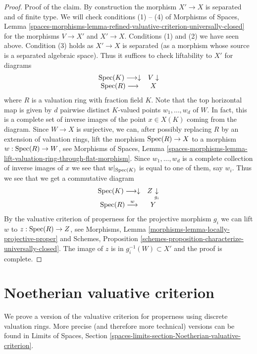 \begin{proof}
\medskip\noindent
Proof of the claim. By construction the morphism $X' \to X$ is separated
and of finite type. We will check conditions (1) -- (4) of
Morphisms of Spaces, Lemma
\ref{spaces-morphisms-lemma-refined-valuative-criterion-universally-closed}
for the morphisms $V \to X'$ and $X' \to X$.
Conditions (1) and (2) we have seen above.
Condition (3) holds as $X' \to X$ is separated (as a morphism whose
source is a separated algebraic space). Thus it suffices to check
liftability to $X'$ for diagrams
$$
\begin{array}{cc}\operatorname{Spec}(K) \longrightarrow\downarrow & V \downarrow \\ \operatorname{Spec}(R) \longrightarrow & X\end{array}
$$
where $R$ is a valuation ring with fraction field $K$.
Note that the top horizontal map is given by $d$ pairwise distinct
$K$-valued points $w_1, \ldots, w_d$ of $W$. In fact, this
is a complete set of inverse images of the point $x \in X(K)$
coming from the diagram. Since $W \to X$ is surjective,
we can, after possibly replacing $R$ by an extension of valuation rings,
lift the morphism $\operatorname{Spec}(R) \to X$ to a morphism $w : \operatorname{Spec}(R) \to W$, see
Morphisms of Spaces, Lemma
\ref{spaces-morphisms-lemma-lift-valuation-ring-through-flat-morphism}.
Since $w_1, \ldots, w_d$ is a complete collection of inverse images of
$x$ we see that $w|_{\operatorname{Spec}(K)}$ is equal to one of them, say $w_i$.
Thus we see that we get a commutative diagram
$$
\begin{array}{cc}\operatorname{Spec}(K) \longrightarrow\downarrow & Z \underset{g_i}{\downarrow} \\ \operatorname{Spec}(R) \overset{w}{\longrightarrow} & Y\end{array}
$$
By the valuative criterion of properness for the projective
morphism $g_i$ we can lift $w$ to $z : \operatorname{Spec}(R) \to Z$, see
Morphisms, Lemma \ref{morphisms-lemma-locally-projective-proper}
and
Schemes, Proposition \ref{schemes-proposition-characterize-universally-closed}.
The image of $z$ is in $g_i^{-1}(W) \subset X'$ and the proof is complete.
\end{proof}

\section{Noetherian valuative criterion}
\label{spaces-cohomology-section-Noetherian-valuative-criterion}
We prove a version of the valuative criterion for properness
using discrete valuation rings. More precise (and therefore more
technical) versions can be found in
Limits of Spaces, Section
\ref{spaces-limits-section-Noetherian-valuative-criterion}.

